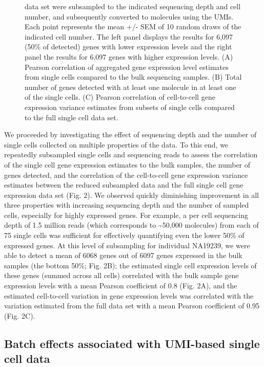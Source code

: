 \begin{figure}[htbp]
{data set were subsampled to the indicated sequencing depth and cell
number, and subsequently converted to molecules using the UMIs. Each
point represents the mean +/- SEM of 10 random draws of the indicated
cell number. The left panel displays the results for 6,097 (50\% of
detected) genes with lower expression levels and the right panel the
results for 6,097 genes with higher expression levels. (A) Pearson
correlation of aggregated gene expression level estimates from single
cells compared to the bulk sequencing samples. (B) Total number of genes
detected with at least one molecule in at least one of the single cells.
(C) Pearson correlation of cell-to-cell gene expression variance
estimates from subsets of single cells compared to the full single cell
data set.}
\end{figure}

We proceeded by investigating the effect of sequencing depth and the
number of single cells collected on multiple properties of the data. To
this end, we repeatedly subsampled single cells and sequencing reads to
assess the correlation of the single cell gene expression estimates to
the bulk samples, the number of genes detected, and the correlation of
the cell-to-cell gene expression variance estimates between the reduced
subsampled data and the full single cell gene expression data set (Fig.
2). We observed quickly diminishing improvement in all three properties
with increasing sequencing depth and the number of sampled cells,
especially for highly expressed genes. For example, a per cell
sequencing depth of 1.5 million reads (which corresponds to
\textasciitilde{}50,000 molecules) from each of 75 single cells was
sufficient for effectively quantifying even the lower 50\% of expressed
genes. At this level of subsampling for individual NA19239, we were able
to detect a mean of 6068 genes out of 6097 genes expressed in the bulk
samples (the bottom 50\%; Fig. 2B); the estimated single cell expression
levels of these genes (summed across all cells) correlated with the bulk
sample gene expression levels with a mean Pearson coefficient of 0.8
(Fig. 2A), and the estimated cell-to-cell variation in gene expression
levels was correlated with the variation estimated from the full data
set with a mean Pearson coefficient of 0.95 (Fig. 2C).

\subsection{Batch effects associated with UMI-based single cell
data}\label{batch-effects-associated-with-umi-based-single-cell-data}

